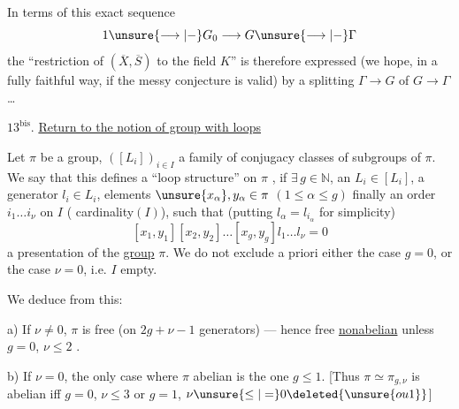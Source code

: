 

In terms of this exact sequence
\[
1\unsure{\longrightarrow|-}G_0\longrightarrow G\unsure{\longrightarrow|-}\Gamma
\]
the ``restriction of $(\overline X,\overline S)$ to the field $K$'' is
therefore expressed (we hope, in a fully faithful way,
if the messy conjecture is valid) by
a splitting $\Gamma\to G$ of $G\to\Gamma$\dots

$13^{\mathrm{bis}}$. \uline{Return to the notion of group with loops}

Let $\pi$ be a group, $([L_i])_{i\in I}$ a family
of conjugacy classes of subgroups of
$\pi$. We say that this defines a 
``loop structure'' on $\pi$ \inserted{[of type $(g,\nu)$]}, if $\exists\,g\in\mathbb N$,
 an $L_i\in[L_i]$, a generator
$l_i\in L_i$, elements $\unsure{x_\alpha},y_\alpha\in\pi$ $(1\le\alpha\le g)$
finally an order $i_1\dots i_\nu$ on $I$ ( \inserted{$\nu=$} cardinality$(I)$),
such that (putting $l_\alpha=l_{i_\alpha}$ for simplicity)
\[
[x_1,y_1][x_2,y_2]\dots[x_g,y_g]l_1\dots l_\nu=0
\]
 a presentation of the \uline{group} $\pi$. We
do not exclude a priori either the case $g=0$, or the case $\nu=0$,
i.e. $I$ empty.

We deduce from this:

a) If $\nu\ne0$, $\pi$ is free (on $2g+\nu-1$ generators) ---
hence free \uline{nonabelian} unless $g=0$, $\nu\le2$ .



b) If $\nu=0$, the only case where $\pi$ abelian is the one
$g\le1$. [Thus $\pi\simeq\pi_{g,\nu}$ is abelian iff
$g=0$, $\nu\le3$ or $g=1$, $\nu\unsure{\le|=}0\deleted{\unsure{ou 1}}$]

